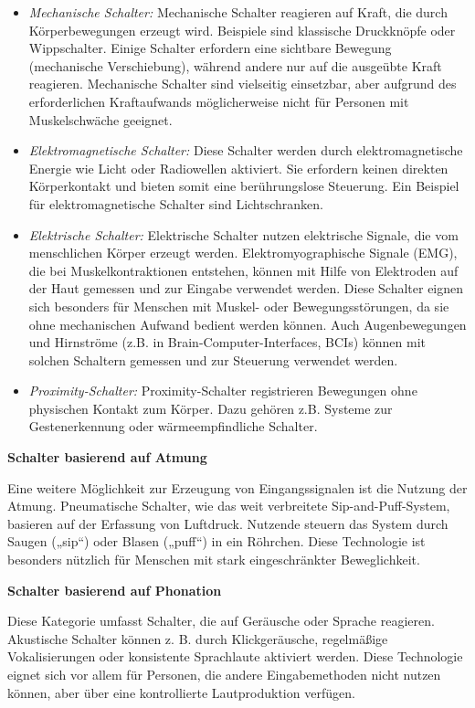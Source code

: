 \begin{itemize}
    \item \textit{Mechanische Schalter:}
    Mechanische Schalter reagieren auf Kraft, die durch Körperbewegungen erzeugt wird. Beispiele sind klassische Druckknöpfe oder Wippschalter. Einige Schalter erfordern eine sichtbare Bewegung (mechanische Verschiebung), während andere nur auf die ausgeübte Kraft reagieren. Mechanische Schalter sind vielseitig einsetzbar, aber aufgrund des erforderlichen Kraftaufwands möglicherweise nicht für Personen mit Muskelschwäche geeignet.
    \item \textit{Elektromagnetische Schalter:}
    Diese Schalter werden durch elektromagnetische Energie wie Licht oder Radiowellen aktiviert. Sie erfordern keinen direkten Körperkontakt und bieten somit eine berührungslose Steuerung. Ein Beispiel für elektromagnetische Schalter sind Lichtschranken.
    \item \textit{Elektrische Schalter:}
    Elektrische Schalter nutzen elektrische Signale, die vom menschlichen Körper erzeugt werden. Elektromyographische Signale (EMG), die bei Muskelkontraktionen entstehen, können mit Hilfe von Elektroden auf der Haut gemessen und zur Eingabe verwendet werden. Diese Schalter eignen sich besonders für Menschen mit Muskel- oder Bewegungsstörungen, da sie ohne mechanischen Aufwand bedient werden können. Auch Augenbewegungen und Hirnströme (z.B. in Brain-Computer-Interfaces, BCIs) können mit solchen Schaltern gemessen und zur Steuerung verwendet werden.
    \item \textit{Proximity-Schalter:}
    Proximity-Schalter registrieren Bewegungen ohne physischen Kontakt zum Körper. Dazu gehören z.B. Systeme zur Gestenerkennung oder wärmeempfindliche Schalter.   
\end{itemize}

\textbf{Schalter basierend auf Atmung}

Eine weitere Möglichkeit zur Erzeugung von Eingangssignalen ist die Nutzung der Atmung. Pneumatische Schalter, wie das weit verbreitete Sip-and-Puff-System, basieren auf der Erfassung von Luftdruck. Nutzende steuern das System durch Saugen („sip“) oder Blasen („puff“) in ein Röhrchen. Diese Technologie ist besonders nützlich für Menschen mit stark eingeschränkter Beweglichkeit.

\textbf{Schalter basierend auf Phonation}

Diese Kategorie umfasst Schalter, die auf Geräusche oder Sprache reagieren. Akustische Schalter können z. B. durch Klickgeräusche, regelmäßige Vokalisierungen oder konsistente Sprachlaute aktiviert werden. 
Diese Technologie eignet sich vor allem für Personen, die andere Eingabemethoden nicht nutzen können, aber über eine kontrollierte Lautproduktion verfügen.

